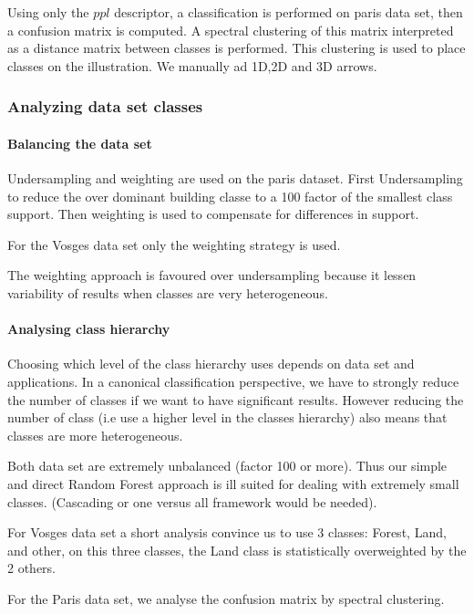 			Using only the $ppl$ descriptor, a classification is performed on paris data set, then a confusion matrix is computed.
			A spectral clustering of this matrix interpreted as a distance matrix between classes is performed. This clustering is used to place classes on the illustration.
			We manually ad 1D,2D and 3D arrows. 
		 
		\subsubsection{Analyzing data set classes}
			\paragraph{Balancing the data set}  
				Undersampling and weighting are used on the paris dataset. First Undersampling to reduce the over dominant building classe to a 100 factor of the smallest class support. Then weighting is used to compensate for differences in support.
				
				For the Vosges data set only the weighting strategy is used.
				
				The weighting approach is favoured over undersampling because it lessen variability of results when classes are very heterogeneous.
				
				
			\paragraph{Analysing class hierarchy} 
				 
				Choosing which level of the class hierarchy uses depends on data set and applications.
				In a canonical classification perspective, we have to strongly reduce the number of classes if we want to have significant results.
				However reducing the number of class (i.e use a higher level in the classes hierarchy) also means that classes are more heterogeneous.
				
				Both data set are extremely unbalanced (factor 100 or more). Thus our simple and direct Random Forest approach is ill suited for dealing with extremely small classes. (Cascading or one versus all framework would be needed).
				
				For Vosges data set a short analysis convince us to use 3 classes: Forest, Land, and other, on this three classes, the Land class is statistically overweighted by the 2 others.	
				
				For the Paris data set, we analyse the confusion matrix by spectral clustering.
				
